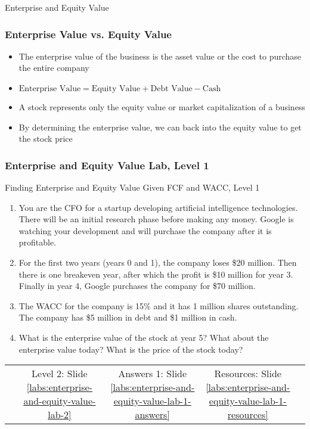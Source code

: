 \documentclass[handout, 11pt]{beamer}
\begin{document}
\begin{section}[EV]{Enterprise and Equity Value}
\begin{frame}
\frametitle{Enterprise Value vs. Equity Value}
\begin{itemize}
\item The enterprise value of the business is the asset value or the cost to purchase the entire company
\vfill
\item $\text{Enterprise Value} = \text{Equity Value} + \text{Debt Value} - \text{Cash}$
\vfill
\item A stock represents only the equity value or market capitalization of a business
\vfill
\item By determining the enterprise value, we can back into the equity value to get the stock price
\end{itemize}
\end{frame}
\small
\begin{frame}
\frametitle{Enterprise and Equity Value Lab, Level 1}
{
\begin{block}{Finding Enterprise and Equity Value Given FCF and WACC, Level 1}
\begin{enumerate}
\item You are the CFO for a startup developing artificial intelligence technologies. There will be an initial research phase before making any money. Google is watching your development and will purchase the company after it is profitable.
\item For the first two years (years 0 and 1), the company loses \$20 million. Then there is one breakeven year, after which the profit is \$10 million for year 3. Finally in year 4, Google purchases the company for \$70 million.
\item The WACC for the company is 15\% and it has 1 million shares outstanding. The company has \$5 million in debt and \$1 million in cash.
\item What is the enterprise value of the stock at year 5? What about the enterprise value today? What is the price of the stock today?
\end{enumerate}
\vfill
\begin{tabular*}{\textwidth}{@{\extracolsep{\fill}}ccccc}
\toprule
\hfill & Level 2: Slide \textcolor{blue}{\underline{\ref{labs:enterprise-and-equity-value-lab-2}}} & Answers 1: Slide \textcolor{blue}{\underline{\ref{labs:enterprise-and-equity-value-lab-1-answers}}} & Resources: Slide \textcolor{blue}{\underline{\ref{labs:enterprise-and-equity-value-lab-1-resources}}} & \hfill\\

\end{tabular*}
\end{block}
}
\label{labs:enterprise-and-equity-value-lab-1}
\end{frame}
\normalsize
\end{section}
\end{document}
